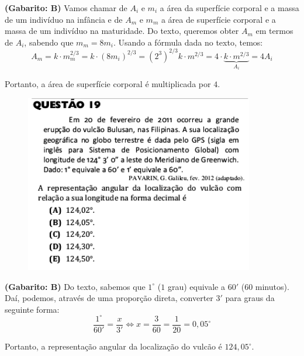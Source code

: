 \documentclass[a4paper]{article}
\begin{document}
\par\textbf{(Gabarito: B)} Vamos chamar de $A_i$ e $m_i$ a área da superfície corporal e a massa de um indivíduo na infância e de $A_m$ e $m_m$ a área de superfície corporal e a massa de um indivíduo na maturidade. Do texto, queremos obter $A_m$ em termos de $A_i$, sabendo que $m_m = 8m_i$. Usando a fórmula dada no texto, temos:
\begin{equation*}
A_m = k\cdot m_m^{2/3} = k\cdot (8m_i)^{2/3} = (2^3)^{2/3}k\cdot m^{2/3} = 4\cdot \underbrace{k\cdot m^{2/3}}_{A_i} = 4A_i
\end{equation*}
\par\vspace{0.3cm} Portanto, a área de superfície corporal é multiplicada por $4$.
\begin{figure}[H]
	\begin{center}
		\includegraphics[width=10cm]{L2Q19.png}
	\end{center}
\end{figure}
\par\textbf{(Gabarito: B)} Do texto, sabemos que $1^\circ$ ($1$ grau) equivale a $60'$ ($60$ minutos). Daí, podemos, através de uma proporção direta, converter $3'$ para graus da seguinte forma:
\begin{equation*}
\frac{1^\circ}{60'} = \frac{x}{3'} \iff x = \frac{3}{60} = \frac{1}{20} = 0,05^\circ
\end{equation*}
\par\vspace{0.3cm} Portanto, a representação angular da localização do vulcão é $124,05^\circ$.
\end{document}
